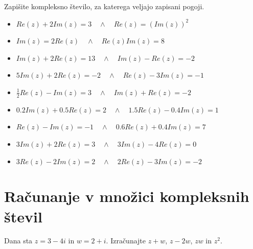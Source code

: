                 \begin{naloga}
                Zapišite kompleksno število, za katerega veljajo zapisani pogoji.
                
                    \begin{itemize}
                        \item $Re(z)+2Im(z)=3 \quad\land\quad Re(z)=\left(Im(z)\right)^2$ 
                        \item $Im(z)=2Re(z) \quad\land\quad Re(z)Im(z)=8$ 
                        \item $Im(z)+2Re(z)=13 \quad\land\quad Im(z)-Re(z)=-2$ 
                        \item $5Im(z)+2Re(z)=-2 \quad\land\quad Re(z)-3Im(z)=-1$ 
                        \item $\frac{1}{2}Re(z)-Im(z)=3 \quad\land\quad Im(z)+Re(z)=-2$ 
                        \item $0.2Im(z)+0.5Re(z)=2 \quad\land\quad 1.5Re(z)-0.4Im(z)=1$ 
                        \item $Re(z)-Im(z)=-1 \quad\land\quad 0.6Re(z)+0.4Im(z)=7$ 
                        \item $3Im(z)+2Re(z)=3 \quad\land\quad 3Im(z)-4Re(z)=0$ 
                        \item $3Re(z)-2Im(z)=2 \quad\land\quad 2Re(z)-3Im(z)=-2$ 
                    \end{itemize}

            \end{naloga}
        

\newpage
    \section{Računanje v množici kompleksnih števil}


    \newpage

        
            \begin{naloga}
                Dana sta $z=3-4i$ in $w=2+i$. Izračunajte $z+w$, $z-2w$, $zw$ in $z^2$.
            \end{naloga}


